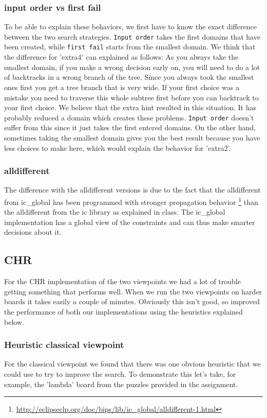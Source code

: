 \documentclass{report}
\begin{document}
\subsubsection{input order vs first fail}
To be able to explain these behaviors, we first have to know the exact difference between the two search strategies. \texttt{Input order} takes the first domains that have been created, while \texttt{first fail} starts from the smallest domain. We think that the difference for 'extra4' can explained as follows: As you always take the smallest domain, if you make a wrong decision early on, you will need to do a lot of backtracks in a wrong branch of the tree. Since you always took the smallest ones first you get a tree branch that is very wide. If your first choice was a mistake you need to traverse this whole subtree first before you can backtrack to your first choice. We believe that the extra hint resulted in this situation. It has probably reduced a domain which creates these problems. \texttt{Input order} doesn't suffer from this since it just takes the first entered domains. On the other hand, sometimes taking the smallest domain gives you the best result because you have less choices to make here, which would explain the behavior for 'extra2'.

\subsubsection{alldifferent}
The difference with the alldifferent versions is due to the fact that the alldifferent from ic\_global has been programmed with stronger propagation behavior \footnote{\url{http://eclipseclp.org/doc/bips/lib/ic\_global/alldifferent-1.html}} than the alldifferent from the ic library as explained in class. The ic\_global implementation has a global view of the constraints and can thus make smarter decisions about it.

\newpage
\subsection{CHR}
\label{sub:CHR}

For the CHR implementation of the two viewpoints we had a lot of trouble getting something that performs well. When we run the two viewpoints on harder boards it takes easily a couple of minutes. Obviously this isn't good, so improved the performance of both our implementations using the heuristics explained below.

\subsubsection{Heuristic classical viewpoint}
For the classical viewpoint we found that there was one obvious heuristic that we could use to try to improve the search. To demonstrate this let's take, for example, the 'lambda' board from the puzzles provided in the assignment.
\end{document}
